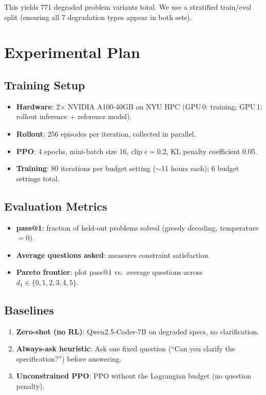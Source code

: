 \documentclass[11pt]{article}
\begin{document}
This yields 771 degraded problem variants total. We use a stratified train/eval split (ensuring all 7 degradation types appear in both sets).

\section{Experimental Plan}

\subsection{Training Setup}

\begin{itemize}[nosep]
  \item \textbf{Hardware}: 2$\times$ NVIDIA A100-40GB on NYU HPC (GPU\,0: training; GPU\,1: rollout inference + reference model).
  \item \textbf{Rollout}: 256 episodes per iteration, collected in parallel.
  \item \textbf{PPO}: 4 epochs, mini-batch size 16, clip $\epsilon = 0.2$, KL penalty coefficient 0.05.
  \item \textbf{Training}: 80 iterations per budget setting ($\sim$11 hours each); 6 budget settings total.
\end{itemize}

\subsection{Evaluation Metrics}

\begin{itemize}[nosep]
  \item \textbf{pass@1}: fraction of held-out problems solved (greedy decoding, temperature $= 0$).
  \item \textbf{Average questions asked}: measures constraint satisfaction.
  \item \textbf{Pareto frontier}: plot pass@1 vs.\ average questions across $d_1 \in \{0, 1, 2, 3, 4, 5\}$.
\end{itemize}

\subsection{Baselines}

\begin{enumerate}[nosep]
  \item \textbf{Zero-shot (no RL)}: Qwen2.5-Coder-7B on degraded specs, no clarification.
  \item \textbf{Always-ask heuristic}: Ask one fixed question (``Can you clarify the specification?'') before answering.
  \item \textbf{Unconstrained PPO}: PPO without the Lagrangian budget (no question penalty).
\end{enumerate}
\end{document}
